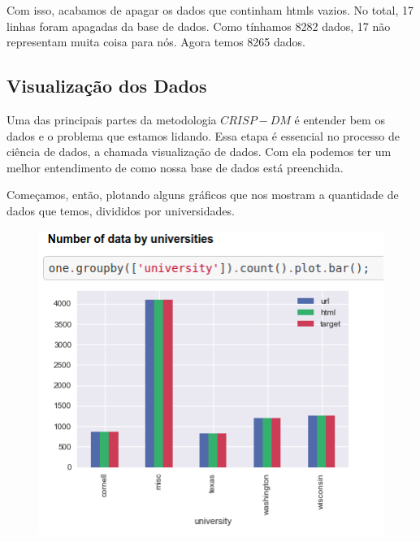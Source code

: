 \documentclass [12pt, a4paper] {article}
\begin{document}
Com isso, acabamos de apagar os dados que continham htmls vazios. No total, 17 linhas foram apagadas da base de dados. Como tínhamos 8282 dados, 17 não representam muita coisa para nós. Agora temos 8265 dados.












\subsection{Visualização dos Dados}

Uma das principais partes da metodologia $CRISP-DM$ é entender bem os dados e o problema que estamos lidando. Essa etapa é essencial no processo de ciência de dados, a chamada visualização de dados. Com ela podemos ter um melhor entendimento de como nossa base de dados está preenchida.

Começamos, então, plotando alguns gráficos que nos mostram a quantidade de dados que temos, divididos por universidades.

\begin{figure}[!hbt]
		\begin{center}
		\includegraphics[width=1\columnwidth]{figuras/universidades.png}
		\end{center}
\end{figure}
\end{document}
